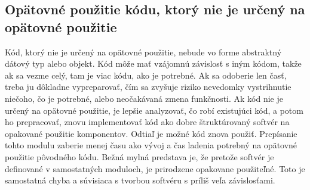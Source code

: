 \documentclass[10pt,twoside,slovak,a4paper]{article}
\begin{document}


\subsection{Opätovné použitie kódu, ktorý nie je určený na opätovné použitie}
Kód, ktorý nie je určený na opätovné použitie, nebude vo forme
abstraktný dátový typ alebo objekt. Kód môže mať vzájomnú závislosť s iným kódom, takže ak sa vezme celý, tam
je viac kódu, ako je potrebné. Ak sa odoberie len časť, treba ju dôkladne vypreparovať, čím sa zvyšuje riziko nevedomky
vystrihnutie niečoho, čo je potrebné, alebo neočakávaná zmena funkčnosti. Ak kód nie je určený na opätovné použitie, je lepšie analyzovať, čo robí existujúci kód, a potom ho prepracovať, znovu implementovať kód ako dobre štruktúrovaný softvér na opakované použitie
komponentov. Odtiaľ je možné kód znova použiť. Prepísanie tohto modulu zaberie menej času ako vývoj a
čas ladenia potrebný na opätovné použitie pôvodného kódu.
Bežná mylná predstava je, že pretože softvér je
definované v samostatných moduloch, je prirodzene opakovane použiteľné. Toto je
samostatná chyba a súvisiaca s tvorbou softvéru
s príliš veľa závislosťami.\cite{25mistakes}
\end{document}
